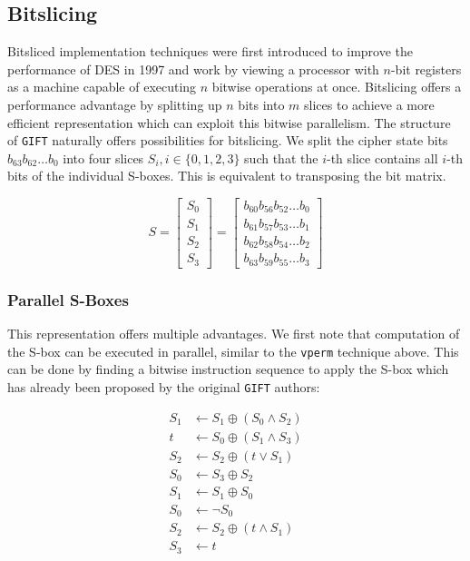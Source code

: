 \subsection{Bitslicing}

Bitsliced implementation techniques were first introduced to improve the performance
of DES in 1997 and work by viewing a processor with $n$-bit registers as a
machine capable of executing $n$ bitwise operations at
once\cite{desslicing:1997}. Bitslicing offers a performance advantage by
splitting up $n$ bits into $m$ slices to achieve a more efficient
representation which can exploit this bitwise parallelism. The structure of
\texttt{GIFT} naturally offers possibilities for bitslicing. We split the
cipher state bits $b_{63}b_{62}\dots b_0$ into four slices $S_i,
i\in\{0,1,2,3\}$ such that the $i$-th slice contains all $i$-th bits of the
individual S-boxes. This is equivalent to transposing the bit matrix.

\[
    S=\begin{bmatrix}
        S_0\\
        S_1\\
        S_2\\
        S_3
    \end{bmatrix}
    =\begin{bmatrix}
        b_{60}b_{56}b_{52}\dots b_0\\
        b_{61}b_{57}b_{53}\dots b_1\\
        b_{62}b_{58}b_{54}\dots b_2\\
        b_{63}b_{59}b_{55}\dots b_3
    \end{bmatrix}
\]

\subsubsection{Parallel S-Boxes}

This representation offers multiple advantages. We first note that computation
of the S-box can be executed in parallel, similar to the \texttt{vperm}
technique above. This can be done by finding a bitwise instruction sequence to
apply the S-box which has already been proposed by the original \texttt{GIFT}
authors:

\begin{align*}
    S_1&\leftarrow S_1\oplus (S_0\land S_2) \\
    t&\leftarrow S_0\oplus (S_1\land S_3) \\
    S_2&\leftarrow S_2\oplus (t\lor S_1) \\
    S_0&\leftarrow S_3\oplus S_2 \\
    S_1&\leftarrow S_1\oplus S_0 \\
    S_0&\leftarrow \lnot S_0 \\
    S_2&\leftarrow S_2\oplus (t\land S_1) \\
    S_3&\leftarrow t
\end{align*}


